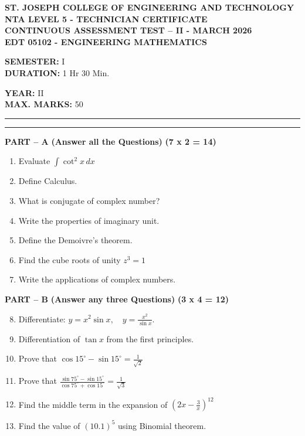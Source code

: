 \documentclass[11pt,a4paper]{article}
\begin{document}
\begin{center}
    \textbf{ST. JOSEPH COLLEGE OF ENGINEERING AND TECHNOLOGY} \\
    \textbf{NTA LEVEL 5 - TECHNICIAN CERTIFICATE} \\
    \textbf{CONTINUOUS ASSESSMENT TEST -- II - MARCH 2026} \\
    \textbf{EDT 05102 - ENGINEERING MATHEMATICS}
\end{center}

\vspace{0.3cm}
\noindent
\begin{minipage}[t]{0.5\textwidth}
    \textbf{SEMESTER:} I \\
    \textbf{DURATION:} 1 Hr 30 Min.
\end{minipage}%
\begin{minipage}[t]{0.5\textwidth}
    \raggedleft
    \textbf{YEAR:} II \\
    \textbf{MAX. MARKS:} 50
\end{minipage}

\vspace{0.2cm}
\hrule
\vspace{0.05cm}
\hrule
\vspace{0.4cm}

\noindent
\textbf{PART -- A} \hfill \textbf{(Answer all the Questions)} \hfill \textbf{(7 x 2 = 14)}

\begin{enumerate}
    \itemsep0em
    \item Evaluate $\int \cot^2 x \, dx$
    \item Define Calculus.
    \item What is conjugate of complex number?
    \item Write the properties of imaginary unit.
    \item Define the Demoivre's theorem.
    \item Find the cube roots of unity $z^3 = 1$
    \item Write the applications of complex numbers.
\end{enumerate}

\vspace{0.3cm}
\noindent
\textbf{PART -- B} \hfill \textbf{(Answer any three Questions)} \hfill \textbf{(3 x 4 = 12)}

\begin{enumerate}
    \setcounter{enumi}{7}
    \itemsep0em
    \item Differentiate: $y = x^2 \sin x, \quad y = \frac{x^2}{\sin x}$.
    \item Differentiation of $\tan x$ from the first principles.
    \item Prove that $\cos 15^\circ - \sin 15^\circ = \frac{1}{\sqrt{2}}$
    \item Prove that $\frac{\sin 75^\circ - \sin 15^\circ}{\cos 75^\circ + \cos 15^\circ} = \frac{1}{\sqrt{3}}$
    \item Find the middle term in the expansion of $\left(2x - \frac{3}{x}\right)^{12}$
    \item Find the value of $(10.1)^5$ using Binomial theorem.
\end{enumerate}
\end{document}
